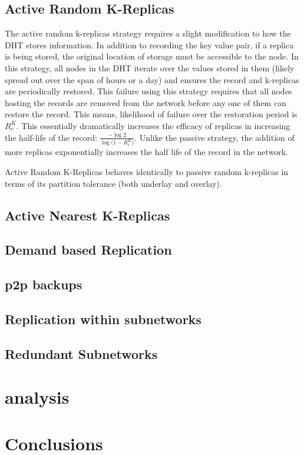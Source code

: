 \subsection{Active Random K-Replicas}
The active random k-replicas strategy requires a slight modification to how the DHT stores information.
In addition to recording the key value pair, if a replica is being stored, the original location of storage must be accessible to the node.
In this strategy, all nodes in the DHT iterate over the values stored in them (likely spread out over the span of hours or a day) and ensures the record and k-replicas are periodically restored.
This failure using this strategy requires that all nodes hosting the records are removed from the network before any one of them can restore the record.
This means, likelihood of failure over the restoration period is $R_{c}^{K}$. This essentially dramatically increases the efficacy of replicas in increasing the half-life of the record: $\frac{-\log{2} }{\log{(1-R_{c}^{K}})}$.
Unlike the passive strategy, the addition of more replicas exponentially increases the half life of the record in the network.

Active Random K-Replicas behaves identically to passive random k-replicas in terms of its partition tolerance (both underlay and overlay).





\subsection{Active Nearest K-Replicas}


\subsection{Demand based Replication}

\subsection{p2p backups}

\subsection{Replication within subnetworks}



\subsection{Redundant Subnetworks}

\section{analysis}

\section{Conclusions}

